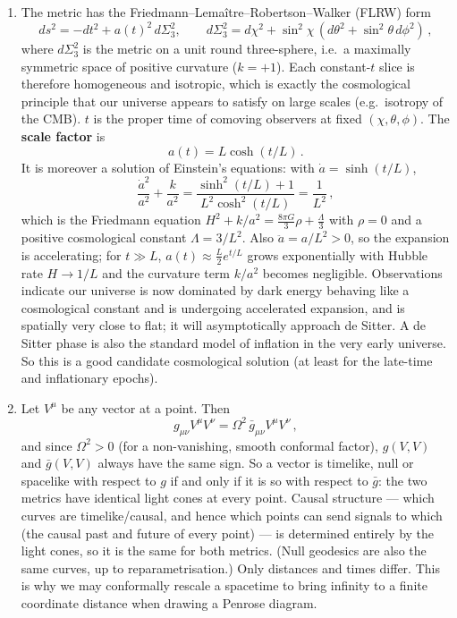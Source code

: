 \documentclass[12pt]{article}
\newcommand{\be}{\begin{equation}}
\newcommand{\ee}{\end{equation}}
\begin{document}
\begin{enumerate}[label=\alph*)]
\item The metric has the Friedmann--Lema\^itre--Robertson--Walker (FLRW) form
\be
ds^2 = -dt^2 + a(t)^2\, d\Sigma_3^2,\qquad d\Sigma_3^2 = d\chi^2 + \sin^2\chi\,(d\theta^2+\sin^2\theta\,d\phi^2)\,,
\ee
where $d\Sigma_3^2$ is the metric on a unit round three-sphere, i.e.\ a maximally symmetric space of positive curvature
($k=+1$). Each constant-$t$ slice is therefore homogeneous and isotropic, which is exactly the cosmological principle
that our universe appears to satisfy on large scales (e.g.\ isotropy of the CMB). $t$ is the proper time of comoving
observers at fixed $(\chi,\theta,\phi)$. The \textbf{scale factor} is
\be
a(t) = L\cosh(t/L)\,.
\ee
It is moreover a solution of Einstein's equations: with $\dot a = \sinh(t/L)$,
\be
\frac{\dot a^2}{a^2} + \frac{k}{a^2} = \frac{\sinh^2(t/L) + 1}{L^2\cosh^2(t/L)} = \frac{1}{L^2}\,,
\ee
which is the Friedmann equation $H^2 + k/a^2 = \frac{8\pi G}{3}\rho + \frac{\Lambda}{3}$ with $\rho=0$ and a positive
cosmological constant $\Lambda = 3/L^2$. Also $\ddot a = a/L^2 > 0$, so the expansion is accelerating; for $t\gg L$,
$a(t)\approx \frac{L}{2}e^{t/L}$ grows exponentially with Hubble rate $H\to 1/L$ and the curvature term $k/a^2$ becomes
negligible. Observations indicate our universe is now dominated by dark energy behaving like a cosmological constant and
is undergoing accelerated expansion, and is spatially very close to flat; it will asymptotically approach de Sitter. A
de Sitter phase is also the standard model of inflation in the very early universe. So this is a good candidate
cosmological solution (at least for the late-time and inflationary epochs).

\item Let $V^\mu$ be any vector at a point. Then
\be
g_{\mu\nu}V^\mu V^\nu = \Omega^2\,\bar g_{\mu\nu}V^\mu V^\nu\,,
\ee
and since $\Omega^2>0$ (for a non-vanishing, smooth conformal factor), $g(V,V)$ and $\bar g(V,V)$ always have the same
sign. So a vector is timelike, null or spacelike with respect to $g$ if and only if it is so with respect to $\bar g$:
the two metrics have identical light cones at every point. Causal structure --- which curves are timelike/causal, and
hence which points can send signals to which (the causal past and future of every point) --- is determined entirely by the
light cones, so it is the same for both metrics. (Null geodesics are also the same curves, up to reparametrisation.) Only
distances and times differ. This is why we may conformally rescale a spacetime to bring infinity to a finite
coordinate distance when drawing a Penrose diagram.


\end{enumerate}
\end{document}
